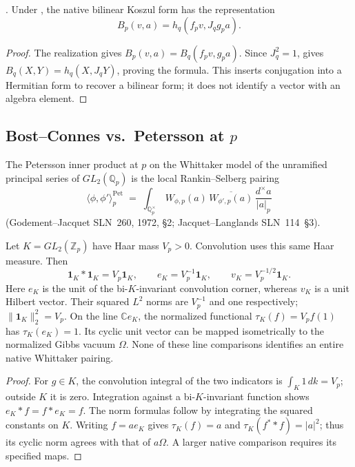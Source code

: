 \begin{proposition}
\label{v4-arith:kp:prop:Koszul-p-is-BC}
\ClaimStatusProvedHereConditional. Under
, the native bilinear
Koszul form has the representation
\begin{equation}
 B_p(v,a)=h_q(f_pv,J_qg_pa).
 \label{v4-arith:kp:eq:Koszul-p-is-BC}
\end{equation}
\end{proposition}
\begin{proof}
The realization gives $B_p(v,a)=B_q(f_pv,g_pa)$.
Since $J_q^2=1$, 
gives $B_q(X,Y)=h_q(X,J_qY)$, proving the formula. This
inserts conjugation into a Hermitian form to recover a bilinear
form; it does not identify a vector with an algebra element.
\end{proof}

\subsection{Bost--Connes vs.~Petersson at \texorpdfstring{\(p\)}{p}}
\label{v4-arith:kp:finite:BC-vs-Pet}

The Petersson inner product at \(p\) on the Whittaker model of
the unramified principal series of \(GL_{2}(\mathbb{Q}_{p})\) is
the local Rankin--Selberg pairing
\begin{equation}
\label{v4-arith:kp:eq:Pet-p-RS}
\langle\phi,\phi'\rangle^{\mathrm{Pet}}_{p}
\;=\;\int_{\mathbb{Q}_{p}^{\times}}\,W_{\phi,p}(a)\,
\overline{W_{\phi',p}(a)}\,
\frac{d^{\times}a}{|a|_{p}}
\end{equation}
(Godement--Jacquet SLN~260, 1972, \S2; Jacquet--Langlands
SLN~114~\S3).

\begin{lemma}
\label{v4-arith:kp:lem:Pet-p-is-Plancherel}
Let \(K=GL_2(\mathbb Z_p)\) have Haar mass \(V_p>0\). Convolution
uses this same Haar measure. Then
\[
 \mathbf1_K*\mathbf1_K=V_p\mathbf1_K,\qquad
 e_K=V_p^{-1}\mathbf1_K,\qquad v_K=V_p^{-1/2}\mathbf1_K.
\]
Here \(e_K\) is the unit of the bi-\(K\)-invariant convolution corner,
whereas \(v_K\) is a unit Hilbert vector. Their squared \(L^2\) norms
are \(V_p^{-1}\) and one respectively; \(\|\mathbf1_K\|_2^2=V_p\).
On the line \(\mathbb C e_K\), the normalized functional
\(\tau_K(f)=V_pf(1)\) has \(\tau_K(e_K)=1\). Its cyclic unit vector
can be mapped isometrically to the normalized Gibbs vacuum \(\Omega\).
None of these line comparisons identifies an entire native Whittaker
pairing.
\end{lemma}
\begin{proof}
For \(g\in K\), the convolution integral of the two indicators is
\(\int_K1\,dk=V_p\); outside \(K\) it is zero. Integration against a
bi-\(K\)-invariant function shows \(e_K*f=f*e_K=f\). The norm
formulas follow by integrating the squared constants on \(K\).
Writing \(f=ae_K\) gives \(\tau_K(f)=a\) and
\(\tau_K(f^**f)=|a|^2\); thus its cyclic norm agrees with that of
\(a\Omega\). A larger native comparison requires its specified maps.
\end{proof}

